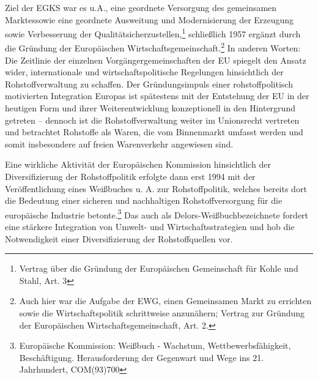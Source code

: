 \documentclass[12pt,a4paper,oneside]{book} %
\begin{document}
Ziel der EGKS war es u.A., eine \glqq geordnete Versorgung des gemeinsamen Marktes\grqq sowie eine \glqq geordnete Ausweitung und Modernisierung der Erzeugung sowie Verbesserung der Qualität\grqq sicherzustellen,\footnote{Vertrag über die Gründung der Europäischen Gemeinschaft für Kohle und Stahl, Art. 3} schließlich 1957 ergänzt durch die Gründung der Europäischen Wirtschaftsgemeinschaft.\footnote{Auch hier war die Aufgabe der EWG, einen Gemeinsamen Markt zu errichten sowie die Wirtschaftspolitik schrittweise anzunähern; Vertrag zur Gründung der Europäischen Wirtschaftsgemeinschaft, Art. 2.} In anderen Worten: Die Zeitlinie der einzelnen Vorgängergemeinschaften der EU spiegelt den Ansatz wider, internationale und wirtschaftspolitische Regelungen hinsichtlich der Rohstoffverwaltung zu schaffen.\autocites{Schorkopf, Europäische Rohstoffverwaltung, Rn. 1}{Schorkopf, AVR 46 2008, S. 249.} Der Gründungsimpuls einer rohstoffpolitisch motivierten Integration Europas ist spätestens mit der Entstehung der EU in der heutigen Form und ihrer Weiterentwicklung konzeptionell in den Hintergrund getreten -- dennoch ist die Rohstoffverwaltung weiter im Unionsrecht vertreten und betrachtet Rohstoffe als Waren, die vom Binnenmarkt umfasst werden und somit insbesondere auf freien Warenverkehr angewiesen sind.\autocite{Schorkopf, Europäische Rohstoffverwaltung, Rn. 2}
	
Eine wirkliche Aktivität der Europäischen Kommission hinsichtlich der Diversifizierung der Rohstoffpolitik erfolgte dann erst 1994 mit der Veröffentlichung eines Weißbuches u. A. zur Rohstoffpolitik, welches bereits dort die Bedeutung einer sicheren und nachhaltigen Rohstoffversorgung für die europäische Industrie betonte.\footnote{Europäische Kommission: Weißbuch - Wachstum, Wettbewerbsfähigkeit, Beschäftigung. Herausforderung der Gegenwart und Wege ins 21. Jahrhundert, COM(93)700}
Das auch als \glqq Delors-Weißbuch\grqq bezeichnete  fordert eine stärkere Integration von Umwelt- und Wirtschaftsstrategien und hob die Notwendigkeit einer Diversifizierung der Rohstoffquellen vor.
	
	
\end{document}
